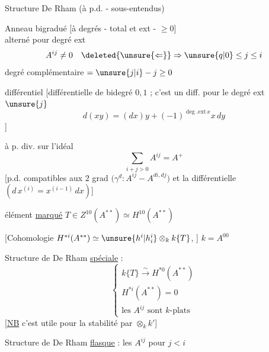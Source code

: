 



Structure De Rham (à p.d. - sous-entendus)

Anneau bigradué [à degrés - total et ext - $\geq0$]\\
alterné pour degré ext
\[
A^{ij}\neq0\quad\deleted{\unsure{\Leftarrow}}\Rightarrow\unsure{q|0}\leq j\leq i
\]
degré complémentaire $=\unsure{j|i}-j\geq0$

différentiel [différentielle de bidegré $0,1$ ; c'est un diff. pour le degré ext $\unsure{j}$
\[
d(xy)=(dx)y+(-1)^{\deg.\mathrm{ext}\,x}x\,dy
\]
]

à p. div. sur l'idéal
\[
\sum_{i+j>0}A^{ij}=A^+
\]
[p.d.  compatibles aux $2$ grad
$\bigl(\gamma^d:A^{ij}\mathbin{-}A^{di,dj}\bigr)$
et la différentielle $(d\,x^{(i)}=x^{(i-1)}\,dx)$]

élément \uline{marqué}
$T\in Z^{10}(A^{**})\simeq H^{10}(A^{**})$

[Cohomologie $H^{*i}(A^{**})\simeq\unsure{h^i|h_i^i}\otimes_k k\{T\}$, ] $k=A^{00}$

Structure de De Rham \uline{spéciale} :
\[
\left\{\begin{array}{l}
k\{T\}\overset{\sim}{\longrightarrow}H^{*0}(A^{**})\\
H^{*i}(A^{**})=0\\
\text{les }A^{ij}\text{ sont }k\text{-plats}
\end{array}\right.
\]
[\uline{NB} c'est utile pour la stabilité par $\otimes_k k'$]

Structure de De Rham \uline{flasque} : les $A^{ij}$ pour $j<i$


